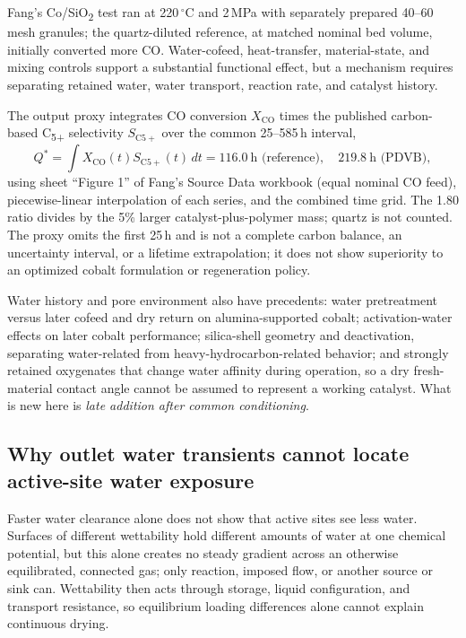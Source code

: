 Fang's Co/SiO\textsubscript{2} test ran at 220\,$^\circ$C and 2\,MPa with separately prepared 40--60 mesh granules; the quartz-diluted reference, at matched nominal bed volume, initially converted more CO. Water-cofeed, heat-transfer, material-state, and mixing controls support a substantial functional effect,\cite{fang2026} but a mechanism requires separating retained water, water transport, reaction rate, and catalyst history.

The output proxy integrates CO conversion $X_{\mathrm{CO}}$ times the published carbon-based C\textsubscript{5+} selectivity $S_{\mathrm{C5+}}$ over the common 25--585\,h interval,
\begin{equation}
 Q^*=\int X_{\mathrm{CO}}(t)S_{\mathrm{C5+}}(t)\,dt
 =116.0\ \text{h (reference)},\quad 219.8\ \text{h (PDVB)},
 \label{eq:water-output}
\end{equation}
using sheet ``Figure 1'' of Fang's Source Data workbook (equal nominal CO feed), piecewise-linear interpolation of each series, and the combined time grid. The 1.80 ratio divides by the 5\% larger catalyst-plus-polymer mass; quartz is not counted. The proxy omits the first 25\,h and is not a complete carbon balance, an uncertainty interval, or a lifetime extrapolation; it does not show superiority to an optimized cobalt formulation or regeneration policy.\cite{fang2026}

Water history and pore environment also have precedents: water pretreatment versus later cofeed and dry return on alumina-supported cobalt;\cite{hanssen1997} activation-water effects on later cobalt performance;\cite{paterson2024} silica-shell geometry and deactivation, separating water-related from heavy-hydrocarbon-related behavior;\cite{yang2020} and strongly retained oxygenates that change water affinity during operation,\cite{sengupta2025} so a dry fresh-material contact angle cannot be assumed to represent a working catalyst. What is new here is \emph{late addition after common conditioning}.

\subsection{Why outlet water transients cannot locate active-site water exposure}

Faster water clearance alone does not show that active sites see less water. Surfaces of different wettability hold different amounts of water at one chemical potential, but this alone creates no steady gradient across an otherwise equilibrated, connected gas; only reaction, imposed flow, or another source or sink can. Wettability then acts through storage, liquid configuration, and transport resistance, so equilibrium loading differences alone cannot explain continuous drying.

